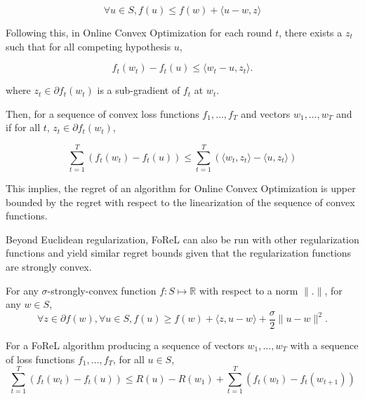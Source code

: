 \begin{equation}
    \forall u \in S, f(u) \leq f(w) + \langle u-w, z \rangle  
\end{equation}

Following this, in Online Convex Optimization for each round $t$, there exists a $z_t$ such that for all competing hypothesis $u$, 

$$f_t(w_t) - f_t(u) \leq \langle w_t - u, z_t \rangle.$$

where $z_t \in \partial f_t(w_t)$ is a sub-gradient of $f_t$ at $w_t$.

Then, for a sequence of convex loss functions $f_1, \ldots, f_T$ and vectors $w_1, \ldots, w_T$ and if for all $t$, $z_t \in \partial f_t(w_t)$,

\begin{equation}
    \sum_{t=1}^T (f_t(w_t) - f_t(u)) \leq \sum_{t=1}^T (\langle w_t, z_t\rangle - \langle u, z_t \rangle)
\end{equation}

This implies, the regret of an algorithm for Online Convex Optimization is upper bounded by the regret with respect to the linearization of the 
sequence of convex functions.


Beyond Euclidean regularization, FoReL can also be run with other regularization functions and yield similar regret bounds given that the regularization functions are 
strongly convex.

\begin{definition}
    For any $\sigma$-strongly-convex function $f: S \mapsto \mathbb{R}$ with respect to a norm $\|.\|$, for any $w \in S$,
    \begin{equation}
        \forall z \in \partial f(w), \forall u \in S, f(u) \geq f(w) + \langle z, u - w\rangle + \frac{\sigma}{2}\| u - w \|^2.
    \end{equation}
\end{definition}



\begin{lemma}\label{lem:forelrb}
    For a FoReL algorithm producing a sequence of vectors $w_1, \ldots, w_T$ with a sequence of loss functions $f_1, \ldots, f_T$, for all $u \in S$, 
    $$\sum_{t=1}^T (f_t(w_t) - f_t(u)) \leq R(u) - R(w_1) + \sum_{t=1}^T (f_t(w_t) - f_t(w_{t+1}))$$
\end{lemma}

